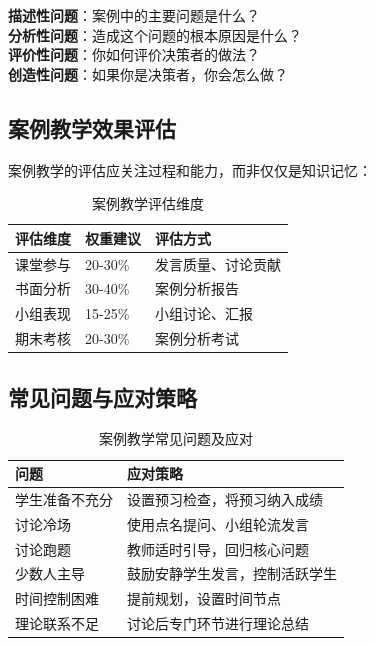 \documentclass[12pt,a4paper]{ctexart}
\begin{document}
\begin{casebox}[讨论题设计示例]
\textbf{描述性问题}：案例中的主要问题是什么？\\
\textbf{分析性问题}：造成这个问题的根本原因是什么？\\
\textbf{评价性问题}：你如何评价决策者的做法？\\
\textbf{创造性问题}：如果你是决策者，你会怎么做？
\end{casebox}

\subsection{案例教学效果评估}

案例教学的评估应关注过程和能力，而非仅仅是知识记忆：

\begin{table}[htbp]
\centering
\caption{案例教学评估维度}
\begin{tabular}{p{3cm}p{3cm}p{5cm}}
\toprule
\textbf{评估维度} & \textbf{权重建议} & \textbf{评估方式} \\
\midrule
课堂参与 & 20-30\% & 发言质量、讨论贡献 \\
书面分析 & 30-40\% & 案例分析报告 \\
小组表现 & 15-25\% & 小组讨论、汇报 \\
期末考核 & 20-30\% & 案例分析考试 \\
\bottomrule
\end{tabular}
\end{table}

\subsection{常见问题与应对策略}

\begin{table}[htbp]
\centering
\caption{案例教学常见问题及应对}
\begin{tabular}{p{4cm}p{7cm}}
\toprule
\textbf{问题} & \textbf{应对策略} \\
\midrule
学生准备不充分 & 设置预习检查，将预习纳入成绩 \\
讨论冷场 & 使用点名提问、小组轮流发言 \\
讨论跑题 & 教师适时引导，回归核心问题 \\
少数人主导 & 鼓励安静学生发言，控制活跃学生 \\
时间控制困难 & 提前规划，设置时间节点 \\
理论联系不足 & 讨论后专门环节进行理论总结 \\
\bottomrule
\end{tabular}
\end{table}
\end{document}
